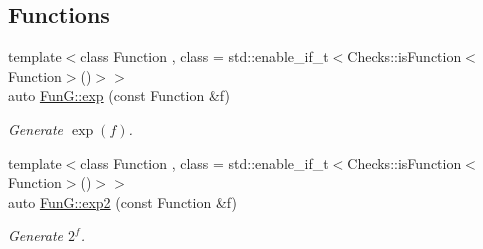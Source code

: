 \subsection*{Functions}
\begin{DoxyCompactItemize}
\item 
{\footnotesize template$<$class Function , class  = std\+::enable\+\_\+if\+\_\+t$<$\+Checks\+::is\+Function$<$\+Function$>$()$>$$>$ }\\auto \hyperlink{group__CMathGroup_ga00135c8521411f13813f9b972ea4e231}{Fun\+G\+::exp} (const Function \&f)
\begin{DoxyCompactList}\small\item\em Generate $ \exp(f) $. \end{DoxyCompactList}\item 
{\footnotesize template$<$class Function , class  = std\+::enable\+\_\+if\+\_\+t$<$\+Checks\+::is\+Function$<$\+Function$>$()$>$$>$ }\\auto \hyperlink{group__CMathGroup_ga7724faf7db6e9583ac91df322c26ecf5}{Fun\+G\+::exp2} (const Function \&f)
\begin{DoxyCompactList}\small\item\em Generate $2^f$. \end{DoxyCompactList}\end{DoxyCompactItemize}
